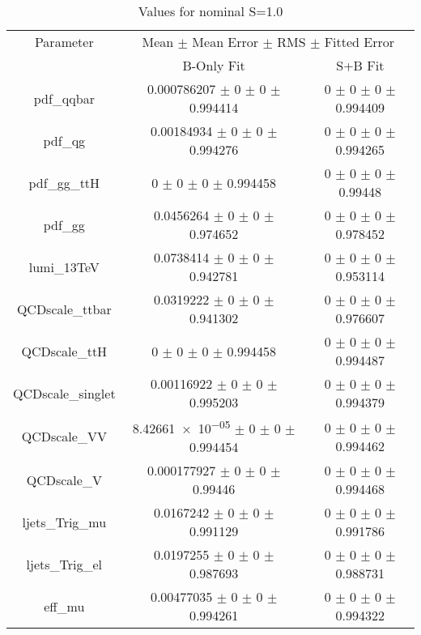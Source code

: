 \begin{table}
\centering
\caption{Values for nominal S=1.0}
\begin{tabular}{ccc}
\toprule
Parameter & \multicolumn{2}{c}{Mean $\pm$ Mean Error $\pm$ RMS $\pm$ Fitted Error}\\
 & B-Only Fit & S+B Fit\\
\midrule
pdf\_qqbar & \num{0.000786207} $\pm$ \num{0} $\pm$ \num{0} $\pm$ \num{0.994414} & \num{0} $\pm$ \num{0} $\pm$ \num{0} $\pm$ \num{0.994409}\\
pdf\_qg & \num{0.00184934} $\pm$ \num{0} $\pm$ \num{0} $\pm$ \num{0.994276} & \num{0} $\pm$ \num{0} $\pm$ \num{0} $\pm$ \num{0.994265}\\
pdf\_gg\_ttH & \num{0} $\pm$ \num{0} $\pm$ \num{0} $\pm$ \num{0.994458} & \num{0} $\pm$ \num{0} $\pm$ \num{0} $\pm$ \num{0.99448}\\
pdf\_gg & \num{0.0456264} $\pm$ \num{0} $\pm$ \num{0} $\pm$ \num{0.974652} & \num{0} $\pm$ \num{0} $\pm$ \num{0} $\pm$ \num{0.978452}\\
lumi\_13TeV & \num{0.0738414} $\pm$ \num{0} $\pm$ \num{0} $\pm$ \num{0.942781} & \num{0} $\pm$ \num{0} $\pm$ \num{0} $\pm$ \num{0.953114}\\
QCDscale\_ttbar & \num{0.0319222} $\pm$ \num{0} $\pm$ \num{0} $\pm$ \num{0.941302} & \num{0} $\pm$ \num{0} $\pm$ \num{0} $\pm$ \num{0.976607}\\
QCDscale\_ttH & \num{0} $\pm$ \num{0} $\pm$ \num{0} $\pm$ \num{0.994458} & \num{0} $\pm$ \num{0} $\pm$ \num{0} $\pm$ \num{0.994487}\\
QCDscale\_singlet & \num{0.00116922} $\pm$ \num{0} $\pm$ \num{0} $\pm$ \num{0.995203} & \num{0} $\pm$ \num{0} $\pm$ \num{0} $\pm$ \num{0.994379}\\
QCDscale\_VV & \num{8.42661e-05} $\pm$ \num{0} $\pm$ \num{0} $\pm$ \num{0.994454} & \num{0} $\pm$ \num{0} $\pm$ \num{0} $\pm$ \num{0.994462}\\
QCDscale\_V & \num{0.000177927} $\pm$ \num{0} $\pm$ \num{0} $\pm$ \num{0.99446} & \num{0} $\pm$ \num{0} $\pm$ \num{0} $\pm$ \num{0.994468}\\
ljets\_Trig\_mu & \num{0.0167242} $\pm$ \num{0} $\pm$ \num{0} $\pm$ \num{0.991129} & \num{0} $\pm$ \num{0} $\pm$ \num{0} $\pm$ \num{0.991786}\\
ljets\_Trig\_el & \num{0.0197255} $\pm$ \num{0} $\pm$ \num{0} $\pm$ \num{0.987693} & \num{0} $\pm$ \num{0} $\pm$ \num{0} $\pm$ \num{0.988731}\\
eff\_mu & \num{0.00477035} $\pm$ \num{0} $\pm$ \num{0} $\pm$ \num{0.994261} & \num{0} $\pm$ \num{0} $\pm$ \num{0} $\pm$ \num{0.994322}\\

\end{tabular}
\end{table}
